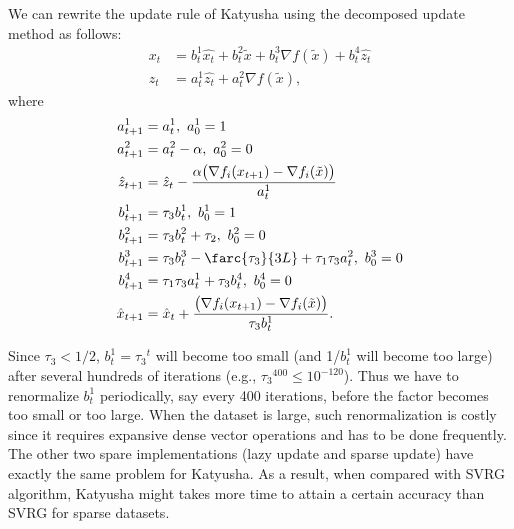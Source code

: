 \documentclass{article}
\begin{document}
We can rewrite the update rule of Katyusha using the decomposed update method as follows:
\begin{equation}
\begin{aligned}
    x_t &= b_t^1 \hat{x_t} + b_t^2 \tilde{x} + b_t^3 \nabla f(\tilde{x}) + b_t^4 \hat{z_t} \\
    z_t &= a_t^1 \hat{z_t} + a_t^2 \nabla f(\tilde{x}),
\end{aligned}
\end{equation}
where
\begin{equation}
\begin{aligned}
    a_{t+1}^1 &= a_t^1, \  a_0^1 = 1 \\
    a_{t+1}^2 &= a_t^2 - \alpha,\  a_0^2 = 0  \\
    \hat{z}_{t+1} &= \hat{z}_t - \frac{\alpha \big(\nabla f_i(x_{t+1}) - \nabla f_i(\tilde{x}) \big)}{a_t^1}  \\
    b_{t+1}^1 &= \tau_3 b_t^1,\  b_0^1 = 1 \\
    b_{t+1}^2 &= \tau_3 b_t^2 + \tau_2,\  b_0^2 = 0 \\
    b_{t+1}^3 &= \tau_3 b_t^3 - \farc{\tau_3}{3L} + \tau_1 \tau_3 a_t^2,\  b_0^3 = 0 \\
    b_{t+1}^4 &= \tau_1 \tau_3 a_t^1 + \tau_3 b_t^4,\  b_0^4 = 0\\
    \hat{x}_{t+1} &= \hat{x}_t + \frac{\big(\nabla f_i(x_{t+1}) - \nabla f_i(\tilde{x}) \big)}{\tau_3 b_t^1}.
\end{aligned}
\end{equation}

Since $\tau_3 < 1/2$, $b_t^1 = {\tau_3}^t$ will become too small (and 1/$b_t^1$ will become too large) after several hundreds of iterations (e.g., ${\tau_3}^{400} \le 10^{-120}$). Thus we have to renormalize $b_t^1$ periodically, say every 400 iterations, before the factor becomes too small or too large. When the dataset is large, such renormalization is costly since it requires expansive dense vector operations and has to be done frequently. The other two spare implementations (lazy update and sparse update) have exactly the same problem for Katyusha. As a result, when compared with SVRG algorithm, Katyusha might takes more time to attain a certain accuracy than SVRG for sparse datasets.




\end{document}
